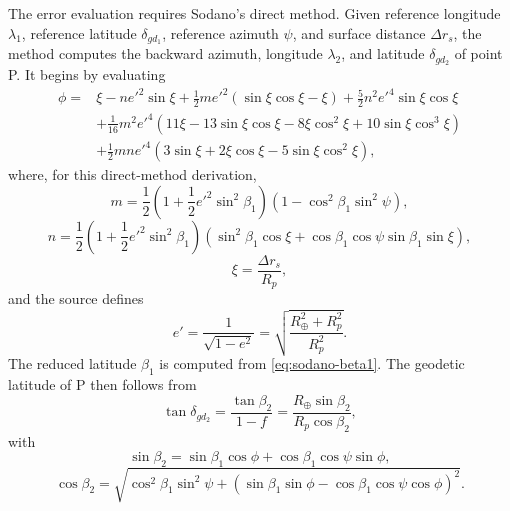 The error evaluation requires Sodano's direct method. Given reference longitude
$\lambda_1$, reference latitude $\delta_{gd_1}$, reference azimuth $\psi$, and
surface distance $\Delta r_s$, the method computes the backward azimuth,
longitude $\lambda_2$, and latitude $\delta_{gd_2}$ of point P.
It begins by evaluating
\begin{equation}
\begin{aligned}
\phi={}&\xi-ne'^2\sin\xi
 +\frac12me'^2(\sin\xi\cos\xi-\xi)
 +\frac52n^2e'^4\sin\xi\cos\xi\\
&+\frac1{16}m^2e'^4
 \left(11\xi-13\sin\xi\cos\xi-8\xi\cos^2\xi
       +10\sin\xi\cos^3\xi\right)\\
&+\frac12mne'^4
 \left(3\sin\xi+2\xi\cos\xi-5\sin\xi\cos^2\xi\right),
\end{aligned}
\label{eq:sodano-direct-phi}
\end{equation}
where, for this direct-method derivation,
\begin{equation}
  m=\frac12
    \left(1+\frac12e'^2\sin^2\beta_1\right)
    \left(1-\cos^2\beta_1\sin^2\psi\right),
  \label{eq:sodano-direct-m}
\end{equation}
\begin{equation}
  n=\frac12
    \left(1+\frac12e'^2\sin^2\beta_1\right)
    \left(\sin^2\beta_1\cos\xi
          +\cos\beta_1\cos\psi\sin\beta_1\sin\xi\right),
  \label{eq:sodano-direct-n}
\end{equation}
\begin{equation}
  \xi=\frac{\Delta r_s}{R_p},
  \label{eq:sodano-direct-xi}
\end{equation}
and the source defines
\begin{equation}
  e'=\frac{1}{\sqrt{1-e^2}}
     =\sqrt{\frac{R_{\oplus}^2+R_p^2}{R_p^2}}.
  \label{eq:sodano-eprime}
\end{equation}
The reduced latitude $\beta_1$ is computed from
\cref{eq:sodano-beta1}. The geodetic latitude of P then follows from
\begin{equation}
  \tan\delta_{gd_2}
  =\frac{\tan\beta_2}{1-f}
  =\frac{R_{\oplus}\sin\beta_2}{R_p\cos\beta_2},
  \label{eq:sodano-direct-latitude}
\end{equation}
with
\begin{equation}
  \sin\beta_2
  =\sin\beta_1\cos\phi+\cos\beta_1\cos\psi\sin\phi,
  \label{eq:sodano-direct-sin-beta2}
\end{equation}
\begin{equation}
  \cos\beta_2
  =\sqrt{\cos^2\beta_1\sin^2\psi
          +\left(\sin\beta_1\sin\phi
                 -\cos\beta_1\cos\psi\cos\phi\right)^2}.
  \label{eq:sodano-direct-cos-beta2}
\end{equation}

